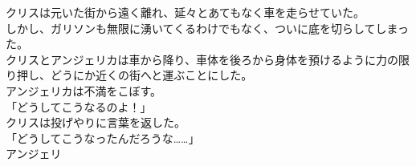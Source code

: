 \documentclass[b5j,10pt,openany]{jsbook}
\begin{document}
クリスは元いた街から遠く離れ、延々とあてもなく車を走らせていた。\\しかし、ガリソンも無限に湧いてくるわけでもなく、ついに底を切らしてしまった。\\クリスとアンジェリカは車から降り、車体を後ろから身体を預けるように力の限り押し、どうにか近くの街へと運ぶことにした。\\アンジェリカは不満をこぼす。\\「どうしてこうなるのよ！」\\クリスは投げやりに言葉を返した。\\「どうしてこうなったんだろうな\ldots{}\ldots{}」\\アンジェリ
\end{document}
